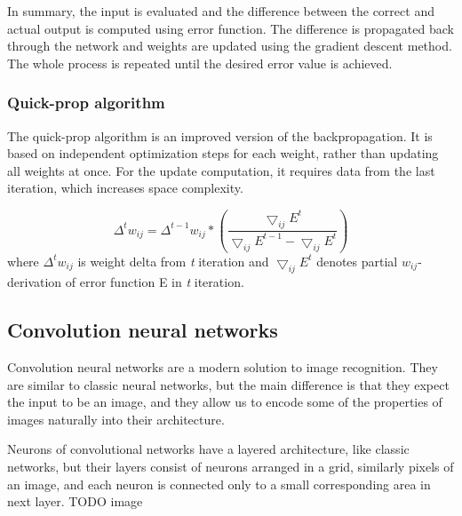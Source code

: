 In summary, the input is evaluated and the difference between the correct and actual output is computed using error function. The difference is propagated back through the network and weights are updated using the gradient descent method. The whole process is repeated until the desired error value is achieved.

\subsubsection{Quick-prop algorithm}
The quick-prop algorithm is an improved version of the backpropagation. It is based on independent optimization steps for each weight, rather than updating all weights at once. For the update computation, it requires data from the last iteration, which increases space complexity. 

\begin{equation*}
\Delta ^{t} w_{ij} = \Delta^{t-1} w_{ij}*(\frac {\bigtriangledown_{ij} E^{t}} {\bigtriangledown_{ij} E^{t-1} - \bigtriangledown_{ij} E^{t}})
\end{equation*}
where $\Delta ^{t} w_{ij}$ is weight delta from \emph{t} iteration and $\bigtriangledown_{ij} E^{t}$ denotes partial $w_{ij}$-derivation of error function E in \emph{t} iteration.

\subsection{Convolution neural networks}
Convolution neural networks are a modern solution to image recognition. They are similar to classic neural networks, but the main difference is that they expect the input to be an image, and they allow us to encode some of the properties of images naturally into their architecture.

Neurons of convolutional networks have a layered architecture, like classic networks, but their layers consist of neurons arranged in a grid, similarly pixels of an image, and each neuron is connected only to a small corresponding area in next layer.  
TODO image

